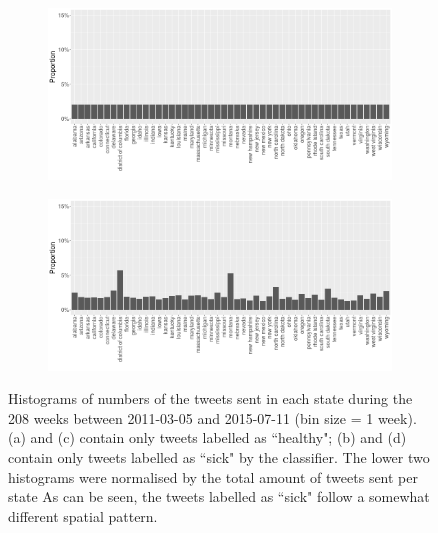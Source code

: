 \documentclass[11pt, a4paper,twoside]{report}\usepackage[]{graphicx}\usepackage[]{color}
\begin{document}
\begin{figure}[H]
    \begin{subfigure}[t]{0.49\textwidth}
  \includegraphics[width=1\linewidth]{activity_rel_healthy_statename_Twitter_full_aggregated.png}
  \caption{}
  \end{subfigure}
  \hfill
    \begin{subfigure}[t]{0.49\textwidth}
  \includegraphics[width=1\linewidth]{activity_rel_sick_statename_Twitter_full_aggregated.png}
  \caption{}
  \end{subfigure}
  \caption{Histograms of numbers of the tweets sent in each state during the 208 weeks between 2011-03-05 and 2015-07-11 (bin size = 1 week). (a) and (c) contain only tweets labelled as ``healthy"; (b) and (d) contain only tweets labelled as ``sick" by the classifier. The lower two histograms were normalised by the total amount of tweets sent per state As can be seen, the tweets labelled as ``sick" follow a somewhat different spatial pattern.}
  \label{fig:tweets_state_healthy_sick}
\end{figure}
\end{document}
